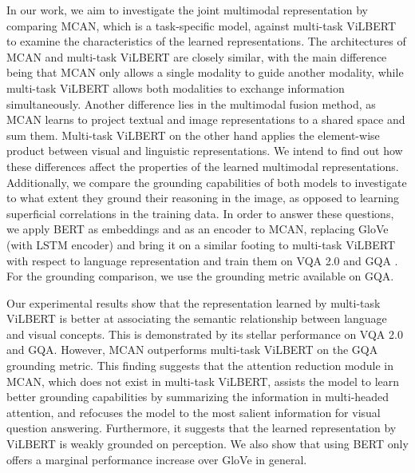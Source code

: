 \documentclass{article}
\newcommand{\todo}[1]{\textbf{\textcolor{Red}{(TODO: #1)}}}
\begin{document}
In our work, we aim to investigate the joint multimodal representation by comparing MCAN, which is a task-specific model, against multi-task ViLBERT to examine the characteristics of the learned representations. The architectures of MCAN and multi-task ViLBERT are closely similar, with the main difference being that MCAN only allows a single modality to guide another modality, while multi-task ViLBERT allows both modalities to exchange information simultaneously. Another difference lies in the multimodal fusion method, as MCAN learns to project textual and image representations to a shared space and sum them. Multi-task ViLBERT on the other hand applies the element-wise product between visual and linguistic representations. We intend to find out how these differences affect the properties of the learned multimodal representations. Additionally, we compare the grounding capabilities of both models to investigate to what extent they ground their reasoning in the image, as opposed to learning superficial correlations in the training data. In order to answer these questions, we apply BERT as embeddings and as an encoder to MCAN, replacing GloVe \citep{pennington2014glove} (with LSTM encoder) and bring it on a similar footing to multi-task ViLBERT with respect to language representation and train them on VQA 2.0 \citep{goyal2017vqa2} and GQA \citep{hudson2019gqa}. For the grounding comparison, we use the grounding metric available on GQA.

Our experimental results show that the representation learned by multi-task ViLBERT is better at associating the semantic relationship between language and visual concepts. This is demonstrated by its stellar performance on VQA 2.0 and GQA.  However, MCAN outperforms multi-task ViLBERT on the GQA grounding metric. This finding suggests that the attention reduction module in MCAN, which does not exist in multi-task ViLBERT, assists the model to learn better grounding capabilities by summarizing the information in multi-headed attention, and refocuses the model to the most salient information for visual question answering. Furthermore, it suggests that the learned representation by ViLBERT is weakly grounded on perception. We also show that using BERT only offers a marginal performance increase over GloVe in general.

\end{document}
